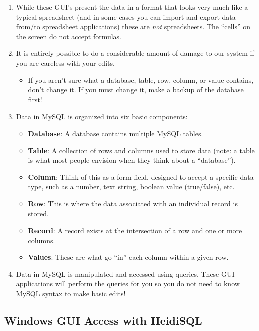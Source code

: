 \documentclass[pdflatex,letterpaper,twoside,12pt]{book}
\begin{document}
\begin{enumerate}
\item While these GUI's present the data in a format that looks very much like a typical spreadsheet (and in some cases you can import and export data from/to spreadsheet applications) these are \emph{not} spreadsheets.  The ``cells'' on the screen do not accept formulas.

\item It is entirely possible to do a considerable amount of damage to our system if you are careless with your edits.
	\begin{itemize}
	\item If you aren't sure what a database, table, row, column, or value contains, don't change it.  If you must change it, make a backup of the database first!
	\end{itemize}
	
\item Data in MySQL is organized into six basic components:
   \begin{itemize}
	\item \textbf{Database}:  A database contains multiple MySQL tables.
	\item \textbf{Table}:  A collection of rows and columns used to store data (note: a table is what most people envision when they think about a ``database'').
	\item \textbf{Column}:  Think of this as a form field, designed to accept a specific data type, such as a number, text string, boolean value (true/false), etc.
	\item \textbf{Row}:  This is where the data associated with an individual record is stored.
	\item \textbf{Record}:  A record exists at the intersection of a row and one or more columns.
	\item \textbf{Values}:  These are what go ``in'' each column within a given row.
   \end{itemize}
   
\item Data in MySQL is manipulated and accessed using queries.  These GUI applications will perform the queries for you so you do not need to know MySQL syntax to make basic edits!
\end{enumerate}

\subsection{Windows GUI Access with HeidiSQL}
\end{document}
